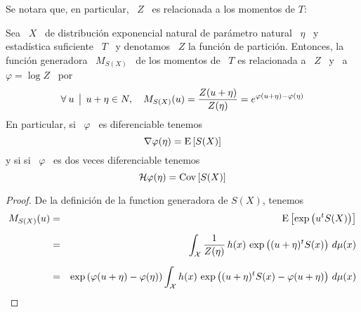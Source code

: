 Se notara que, en particular, \ $Z$ \ es relacionada a los momentos de $T$:
%
\begin{teorema}
%
  Sea \  $X$ \  de distribuci\'on exponencial  natural de par\'ametro  natural \
  $\eta$ \ y estad\'istica suficiente \ $T$  \ y denotamos \ $Z$ la funci\'on de
  partici\'on. Entonces, la funci\'on generadora  \ $M_{S(X)}$ \ de los momentos
  de \ $T$ es relacionada a \ $Z$ \ y \ a \ $\varphi = \log Z$ \ por
  \[
  \forall \: u \:\: \big| \:\: u+\eta \in N, \quad M_{S(X)}(u) = \frac{Z(u+\eta)}{Z(\eta)} =
  e^{\varphi(u+\eta) - \varphi(\eta)}
  \]
  En particular, si \  $\varphi$ \ es diferenciable tenemos
  \[
  \nabla \varphi (\eta) = \operatorname{E}\left[ S(X) \right]
  \]
  y si si \ $\varphi$ \ es dos veces diferenciable tenemos
  \[
  \mathcal{H} \varphi (\eta) = \operatorname{Cov}\left[ S(X) \right]
  \]

\end{teorema}
%
\begin{proof}
  De la definici\'on de la function generadora de $S(X)$, tenemos
  \begin{eqnarray*}
  M_{S(X)}(u) & = &\operatorname{E}\left[ \exp\left( u^t S(X) \right) \right]\\[2mm]
  & = & \int_{\mathcal{X}} \frac{1}{Z(\eta)} \, h(x) \, \exp\left( (u + \eta)^t S(x) \right) \,
  d\mu(x)\\[2mm]
& = & \exp\left( \varphi(u+\eta) - \varphi(\eta) \right) \int_{\mathcal{X}} h(x) \, \exp\left( (u + \eta)^t S(x) - \varphi(u+\eta) \right) \, d\mu(x)
  \end{eqnarray*}
\end{proof}


